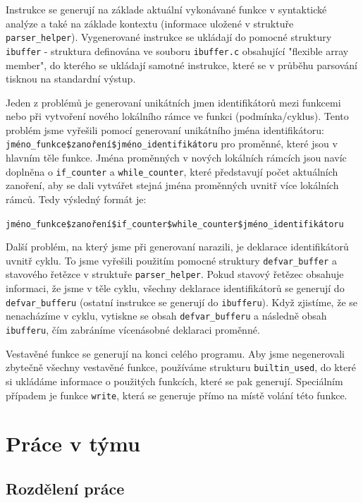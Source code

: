 \documentclass[11pt]{article}
\begin{document}
Instrukce se generují na základe aktuální vykonávané funkce v syntaktické analýze a také na základe kontextu (informace uložené v struktuře
\texttt{parser\_helper}). Vygenerované instrukce se ukládají do pomocné struktury \texttt{ibuffer} - struktura definována ve souboru \texttt{ibuffer.c}
obsahující "flexible array member", do kterého se ukládají samotné instrukce, které se v průběhu parsování tisknou na standardní výstup.


Jeden z problémů je generovaní unikátních jmen identifikátorů mezi funkcemi nebo při vytvoření nového lokálního rámce ve funkci (podmínka/cyklus).
Tento problém jsme vyřešili pomocí generovaní unikátního jména identifikátoru: \texttt{jméno\_funkce\$zanoření\$jméno\_identifikátoru} pro proměnné,
které jsou v hlavním těle funkce. Jména proměnných v nových lokálních rámcích jsou navíc doplněna o \texttt{if\_counter} a \texttt{while\_counter},
které představují počet aktuálních zanoření, aby se dali vytvářet stejná jména proměnných uvnitř více lokálních rámců. Tedy výsledný formát je:

\texttt{jméno\_funkce\$zanoření\$if\_counter\$while\_counter\$jméno\_identifikátoru}


Další problém, na který jsme při generovaní narazili, je deklarace identifikátorů uvnitř cyklu. To jsme vyřešili použitím pomocné struktury
\texttt{defvar\_buffer} a stavového řetězce v struktuře \texttt{parser\_helper}. Pokud stavový řetězec obsahuje informaci, že jsme v těle cyklu,
všechny deklarace identifikátorů se generují do \texttt{defvar\_bufferu} (ostatní instrukce se generují do \texttt{ibufferu}). Když zjistíme,
že se nenacházíme v cyklu, vytiskne se obsah \texttt{defvar\_bufferu} a následně obsah \texttt{ibufferu}, čím zabráníme vícenásobné deklaraci proměnné.

Vestavěné funkce se generují na konci celého programu. Aby jsme negenerovali zbytečně všechny vestavěné funkce, používáme strukturu \texttt{builtin\_used},
do které si ukládáme informace o použitých funkcích, které se pak generují. Speciálním případem je funkce \texttt{write}, která se generuje přímo na místě volání této funkce.

\section{Práce v týmu}

\subsection{Rozdělení práce}
\end{document}
